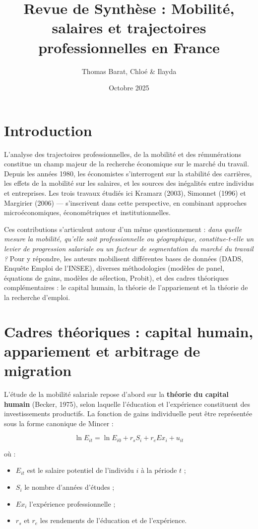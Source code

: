 \documentclass[12pt,a4paper]{article}
\title{Revue de Synthèse : Mobilité, salaires et trajectoires professionnelles en France}
\author{Thomas Barat, Chloé \& Ilayda}
\date{Octobre 2025}
\begin{document}
\maketitle

\section*{Introduction}

L’analyse des trajectoires professionnelles, de la mobilité et des rémunérations constitue un champ majeur de la recherche économique sur le marché du travail. 
Depuis les années 1980, les économistes s’interrogent sur la stabilité des carrières, les effets de la mobilité sur les salaires, et les sources des inégalités entre individus et entreprises.  
Les trois travaux étudiés ici  Kramarz (2003), Simonnet (1996) et Margirier (2006) — s’inscrivent dans cette perspective, en combinant approches microéconomiques, économétriques et institutionnelles.

Ces contributions s’articulent autour d’un même questionnement : \textit{dans quelle mesure la mobilité, qu’elle soit professionnelle ou géographique, constitue-t-elle un levier de progression salariale ou un facteur de segmentation du marché du travail ?}  
Pour y répondre, les auteurs mobilisent différentes bases de données (DADS, Enquête Emploi de l’INSEE), diverses méthodologies (modèles de panel, équations de gains, modèles de sélection, Probit), et des cadres théoriques complémentaires : le capital humain, la théorie de l’appariement et la théorie de la recherche d’emploi.

\section{Cadres théoriques : capital humain, appariement et arbitrage de migration}

L’étude de la mobilité salariale repose d’abord sur la \textbf{théorie du capital humain} (Becker, 1975), selon laquelle l’éducation et l’expérience constituent des investissements productifs.  
La fonction de gains individuelle peut être représentée sous la forme canonique de Mincer :

\begin{equation}
\ln E_{it} = \ln E_{i0} + r_s S_i + r_e Ex_i + u_{it}
\end{equation}

où :
\begin{itemize}
    \item $E_{it}$ est le salaire potentiel de l’individu $i$ à la période $t$ ;
    \item $S_i$ le nombre d’années d’études ;
    \item $Ex_i$ l’expérience professionnelle ;
    \item $r_s$ et $r_e$ les rendements de l’éducation et de l’expérience.
\end{itemize}
\end{document}
